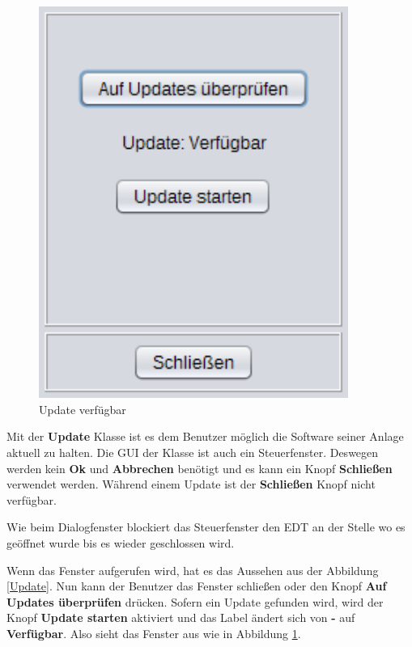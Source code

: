 \begin{figure}[H]
\begin{minipage}[hbt]{0.45\textwidth}
    \includegraphics[width=0.9\textwidth]{Bilder/GUI/Update2}
  	\caption{Update verfügbar}
  	\label{Update2}
  \end{minipage}
  \vspace{0pt}
\end{figure}
Mit der \textbf{Update} Klasse ist es dem Benutzer möglich die Software seiner Anlage aktuell zu halten. Die GUI der Klasse ist auch ein Steuerfenster. Deswegen werden kein \textbf{Ok} und \textbf{Abbrechen} benötigt und es kann ein Knopf \textbf{Schließen} verwendet werden. Während einem Update ist der \textbf{Schließen} Knopf nicht verfügbar.

\vspace{10pt}

Wie beim Dialogfenster blockiert das Steuerfenster den EDT an der Stelle wo es geöffnet wurde bis es wieder geschlossen wird.

\vspace{10pt}

Wenn das Fenster aufgerufen wird, hat es das Aussehen aus der Abbildung \ref{Update}. Nun kann der Benutzer das Fenster schließen oder den Knopf \textbf{Auf Updates überprüfen} drücken. Sofern ein Update gefunden wird, wird der Knopf \textbf{Update starten} aktiviert und das Label ändert sich von \textbf{-} auf \textbf{Verfügbar}. Also sieht das Fenster aus wie in Abbildung \ref{Update2}.

